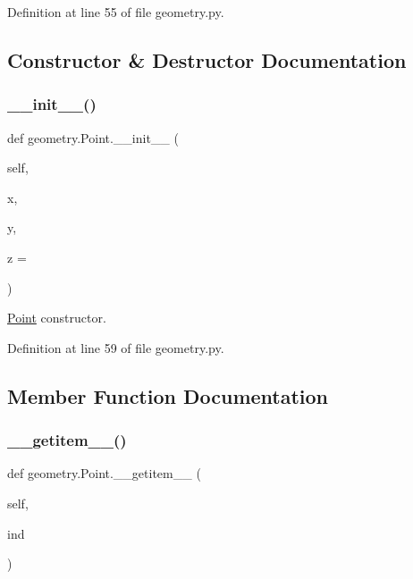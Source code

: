 Definition at line 55 of file geometry.\+py.



\subsection{Constructor \& Destructor Documentation}
\mbox{\label{classgeometry_1_1Point_accb3af71f20d5531f1a478c4f5ca8105}} 
\subsubsection{\texorpdfstring{\+\_\+\+\_\+init\+\_\+\+\_\+()}{\_\_init\_\_()}}
{\footnotesize\ttfamily def geometry.\+Point.\+\_\+\+\_\+init\+\_\+\+\_\+ (\begin{DoxyParamCaption}\item[{}]{self,  }\item[{}]{x,  }\item[{}]{y,  }\item[{}]{z = {} }\end{DoxyParamCaption})}



\hyperlink{classgeometry_1_1Point}{Point} constructor. 



Definition at line 59 of file geometry.\+py.



\subsection{Member Function Documentation}
\mbox{\label{classgeometry_1_1Point_a68cd5b720a72a8c546c2b11b60d2dd76}} 
\subsubsection{\texorpdfstring{\+\_\+\+\_\+getitem\+\_\+\+\_\+()}{\_\_getitem\_\_()}}
{\footnotesize\ttfamily def geometry.\+Point.\+\_\+\+\_\+getitem\+\_\+\+\_\+ (\begin{DoxyParamCaption}\item[{}]{self,  }\item[{}]{ind }\end{DoxyParamCaption})}



